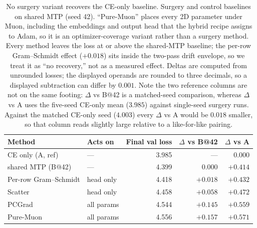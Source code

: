 \begin{table}[h]
\centering
\begin{tabular}{llrrr}
\toprule
Method & Acts on & Final val loss & $\Delta$ vs B@42 & $\Delta$ vs A \\
\midrule
CE only (A, ref)            & ---        & 3.985 & ---     & 0.000 \\
shared MTP (B@42)           & ---        & 4.399 & 0.000   & $+0.414$ \\
Per-row Gram--Schmidt       & head only  & 4.418 & $+0.018$ & $+0.432$ \\
Scatter                     & head only  & 4.458 & $+0.058$ & $+0.472$ \\
PCGrad                      & all params & 4.544 & $+0.145$ & $+0.559$ \\
Pure-Muon                   & all params & 4.556 & $+0.157$ & $+0.571$ \\
\bottomrule
\end{tabular}
\caption{No surgery variant recovers the CE-only baseline. Surgery and control baselines on shared MTP (seed 42). ``Pure-Muon'' places
every 2D parameter under Muon, including the embeddings and output head that the
hybrid recipe assigns to Adam, so it is an optimizer-coverage variant rather than a
surgery method. Every method leaves
the loss at or above the shared-MTP baseline; the per-row Gram--Schmidt effect
($+0.018$) sits inside the two-pass drift envelope, so we treat it as ``no
recovery,'' not as a measured effect. Deltas are computed from unrounded losses;
the displayed operands are rounded to three decimals, so a displayed subtraction
can differ by $0.001$. Note the two reference columns are not on the same footing:
$\Delta$ vs B@42 is a matched-seed comparison, whereas $\Delta$ vs A uses the
five-seed CE-only mean ($3.985$) against single-seed surgery runs. Against the
matched CE-only seed ($4.003$) every $\Delta$ vs A would be $0.018$ smaller, so
that column reads slightly large relative to a like-for-like pairing.}
\label{tab:surgery}
\end{table}

